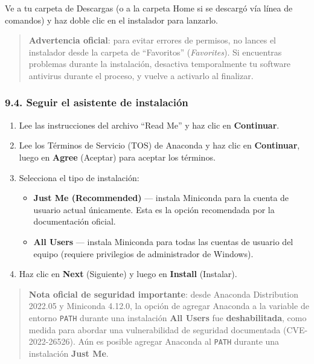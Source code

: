 \documentclass[
  doc,
  floatsintext,
  longtable,
  a4paper,
  nolmodern,
  notxfonts,
  notimes,
  12pt,
  colorlinks=true,linkcolor=blue,citecolor=blue,urlcolor=blue]{apa7}
\providecommand{\tightlist}{%
  \setlength{\itemsep}{0pt}\setlength{\parskip}{0pt}}
\begin{document}
Ve a tu carpeta de Descargas (o a la carpeta Home si se descargó vía
línea de comandos) y haz doble clic en el instalador para lanzarlo.

\begin{quote}
\textbf{Advertencia oficial}: para evitar errores de permisos, no lances
el instalador desde la carpeta de ``Favoritos'' (\emph{Favorites}). Si
encuentras problemas durante la instalación, desactiva temporalmente tu
software antivirus durante el proceso, y vuelve a activarlo al
finalizar.
\end{quote}

\subsubsection{9.4. Seguir el asistente de
instalación}\label{seguir-el-asistente-de-instalaciuxf3n}

\begin{enumerate}
\def\labelenumi{\arabic{enumi}.}
\tightlist
\item
  Lee las instrucciones del archivo ``Read Me'' y haz clic en
  \textbf{Continuar}.
\item
  Lee los Términos de Servicio (TOS) de Anaconda y haz clic en
  \textbf{Continuar}, luego en \textbf{Agree} (Aceptar) para aceptar los
  términos.
\item
  Selecciona el tipo de instalación:

  \begin{itemize}
  \tightlist
  \item
    \textbf{Just Me (Recommended)} --- instala Miniconda para la cuenta
    de usuario actual únicamente. Esta es la opción recomendada por la
    documentación oficial.
  \item
    \textbf{All Users} --- instala Miniconda para todas las cuentas de
    usuario del equipo (requiere privilegios de administrador de
    Windows).
  \end{itemize}
\item
  Haz clic en \textbf{Next} (Siguiente) y luego en \textbf{Install}
  (Instalar).
\end{enumerate}

\begin{quote}
\textbf{Nota oficial de seguridad importante}: desde Anaconda
Distribution 2022.05 y Miniconda 4.12.0, la opción de agregar Anaconda a
la variable de entorno \texttt{PATH} durante una instalación \textbf{All
Users} fue \textbf{deshabilitada}, como medida para abordar una
vulnerabilidad de seguridad documentada (CVE-2022-26526). Aún es posible
agregar Anaconda al \texttt{PATH} durante una instalación \textbf{Just
Me}.
\end{quote}
\end{document}
